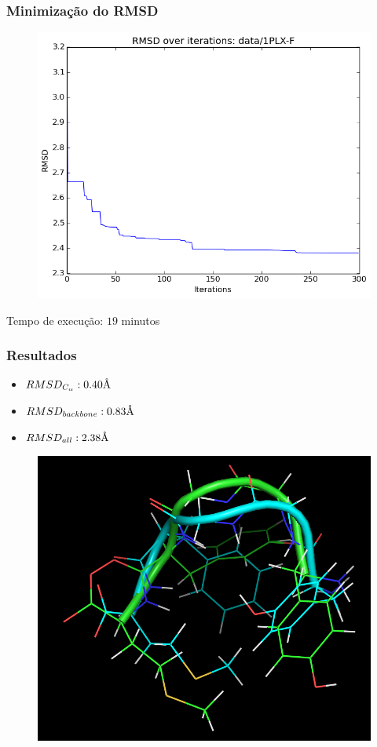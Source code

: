 \documentclass{beamer}
\newcommand{\angstrom}{\textup{\AA}}
\begin{document}
\begin{frame}
\frametitle{Minimização do RMSD}
\begin{figure}
\includegraphics[width=0.7\linewidth]{1PLX-F_rmsd.png}
\end{figure}
Tempo de execução: $19$ minutos
\end{frame}

\begin{frame}
\frametitle{Resultados}
\begin{itemize}
  \item $RMSD_{C_\alpha}: 0.40 \angstrom$
  \item $RMSD_{backbone}: 0.83 \angstrom$
  \item $RMSD_{all}: 2.38 \angstrom$ 
\end{itemize}
\begin{figure}
\includegraphics[width=0.5\linewidth]{1PLX-F.png}
\end{figure}
\end{frame}
\end{document}
